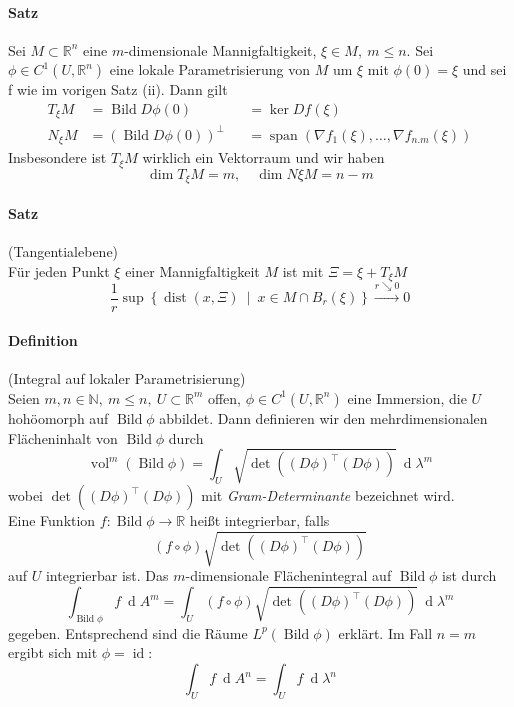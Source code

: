 \documentclass[12pt,a4paper,fleqn]{article}
\def\set#1{{\left\{ #1 \right\}}}
\def\Mid{\ \middle|\ }
\def\R{{\mathbb{R}}}
\def\d{{\operatorname{d}}}
\begin{document}
\paragraph{Satz} Sei $M \subset \R^n$ eine $m$-dimensionale Mannigfaltigkeit, $\xi \in M,\ m \leq n$. Sei $\phi \in C^1(U, \R^n)$ eine lokale Parametrisierung von $M$ um $\xi$ mit $\phi(0) = \xi$ und sei f wie im vorigen Satz (ii). Dann gilt
\begin{align*}
T_\xi M &= \operatorname{Bild} D\phi(0) &&= \ker Df(\xi) \\
N_\xi M &= (\operatorname{Bild} D\phi(0))^\perp &&= \operatorname{span}(\nabla f_1(\xi), \dots, \nabla f_{n.m}(\xi))
\end{align*}
Insbesondere ist $T_\xi M$ wirklich ein Vektorraum und wir haben 
\begin{displaymath}
\dim T_\xi M = m,\quad \dim N\xi M = n-m
\end{displaymath}

\paragraph{Satz} (Tangentialebene)\\
Für jeden Punkt $\xi$ einer Mannigfaltigkeit $M$ ist mit $\Xi = \xi + T_\xi M$
\begin{displaymath}
\frac{1}{r}\sup\set{\operatorname{dist}(x, \Xi) \Mid x \in M\cap B_r(\xi)} \xrightarrow{r \searrow 0} 0
\end{displaymath}

\paragraph{Definition} (Integral auf lokaler Parametrisierung)\\
Seien $m, n \in \mathbb{N},\ m \leq n,\ U \subset \R^m$ offen, $\phi \in C^1(U, \R^n)$ eine Immersion, die $U$ hohöomorph auf $\operatorname{Bild} \phi$ abbildet. Dann definieren wir den mehrdimensionalen Flächeninhalt von $\operatorname{Bild} \phi$ durch
\begin{displaymath}
\operatorname{vol}^m(\operatorname{Bild} \phi) = \int_U \sqrt{\det((D\phi)^\top(D\phi))}\ \d\lambda^m
\end{displaymath}
wobei $\det ((D\phi)^\top(D\phi))$ mit \textit{Gram-Determinante} bezeichnet wird.\\
 Eine Funktion $f\colon \operatorname{Bild} \phi \rightarrow \R$ heißt integrierbar, falls
 \begin{displaymath}
 (f \circ \phi)\sqrt{\det((D\phi)^\top(D\phi))}
 \end{displaymath}
 auf $U$ integrierbar ist. Das $m$-dimensionale Flächenintegral auf $\operatorname{Bild}\phi$ ist durch 
 \begin{displaymath}
 \int_{\operatorname{Bild} \phi} f\ \d A^m = \int_U (f \circ \phi)\sqrt{\det((D\phi)^\top(D\phi))}\ \d\lambda^m
 \end{displaymath}
 gegeben. Entsprechend sind die Räume $L^p(\operatorname{Bild}\phi)$ erklärt.
 Im Fall $n = m$ ergibt sich mit $\phi = \operatorname{id}$:
 \begin{displaymath}
 \int_U f\ \d A^n = \int_U f\ \d\lambda^n
 \end{displaymath}
 
\end{document}
